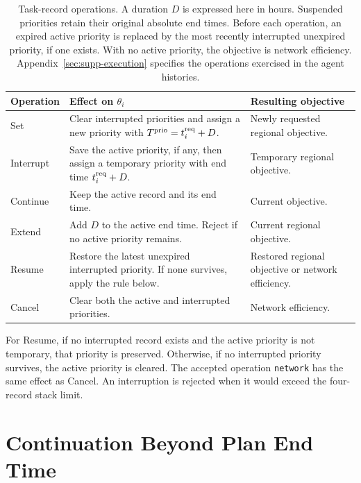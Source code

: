 \documentclass[final]{cas-sc}
\theoremstyle{definition}
\theoremstyle{plain}
\theoremstyle{definition}
\theoremstyle{plain}
\newcommand{\appref}[1]{Appendix~\ref{#1}}
\begin{document}
\begin{table}[pos=H]
\centering\small
\caption{Task-record operations. A duration $D$ is expressed here in
hours. Suspended priorities retain their original absolute end times.
Before each operation, an expired active priority is replaced by the
most recently interrupted unexpired priority, if one exists. With no
active priority, the objective is network efficiency. \appref{sec:supp-execution} specifies the operations exercised in
the agent histories.}
\label{tab:task-operations}
\begin{tabularx}{\textwidth}{@{}l>{\raggedright\arraybackslash}X>{\raggedright\arraybackslash}X@{}}
\toprule
Operation & Effect on $\theta_i$ & Resulting objective\\
\midrule
Set & Clear interrupted priorities and assign a new priority with
$T^{\rm prio}=t_i^{\rm req}+D$. & Newly requested regional objective.\\
Interrupt & Save the active priority, if any, then assign a temporary
priority with end time $t_i^{\rm req}+D$. & Temporary regional objective.\\
Continue & Keep the active record and its end time. & Current objective.\\
Extend & Add $D$ to the active end time. Reject if no active priority
remains. & Current regional objective.\\
Resume & Restore the latest unexpired interrupted priority. If none
survives, apply the rule below. & Restored regional objective or network
efficiency.\\
Cancel & Clear both the active and interrupted priorities. & Network
efficiency.\\
\bottomrule
\end{tabularx}
\par\smallskip\raggedright\footnotesize
For Resume, if no interrupted record exists and the active priority is
not temporary, that priority is preserved. Otherwise, if no interrupted
priority survives, the active priority is cleared. The accepted operation \texttt{network} has the same effect as Cancel.
An interruption is rejected when it would exceed the four-record stack
limit.
\end{table}

\section{Continuation Beyond Plan End Time}
\label{sec:terminal-backup-main}
\label{sec:terminal-backup}
\end{document}
